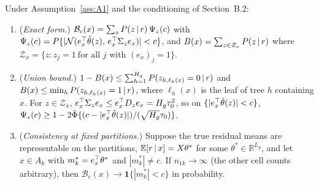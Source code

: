 \begin{propA}\label{prop:ensemble}
Under Assumption~\ref{ass:A1} and the conditioning of Section~B.2:
\begin{enumerate}[label=(\alph*),leftmargin=2.2em]
\item (\emph{Exact form.}) $\mathcal B_c(x)=\sum_zP(z\,\vert\, r)\,\Psi_z(c)$ with $\Psi_z(c)=P\{|\mathcal{N}(e_x^{\top}\hat\theta(z),\,e_x^{\top}\Sigma_ze_x)|<c\}$, and $B(x)=\sum_{z\in\mathcal Z_x}P(z\,\vert\, r)$ where $\mathcal Z_x=\{z:z_j=1\ \text{for all }j\text{ with }(e_x)_j=1\}$.
\item (\emph{Union bound.}) $1-B(x)\le\sum_{h=1}^{H_g}P(z_{h,\ell_h(x)}=0\,\vert\, r)$ and $B(x)\le\min_hP(z_{h,\ell_h(x)}=1\,\vert\, r)$, where $\ell_h(x)$ is the leaf of tree $h$ containing $x$. For $z\in\mathcal Z_x$, $e_x^{\top}\Sigma_ze_x\le e_x^{\top} D_ze_x=H_g\tau_0^2$, so on $\{|e_x^{\top}\hat\theta(z)|<c\}$, $\Psi_z(c)\ge1-2\bar\Phi\{(c-|e_x^{\top}\hat\theta(z)|)/(\sqrt{H_g}\tau_0)\}$.
\item (\emph{Consistency at fixed partitions.}) Suppose the true residual means are representable on the partitions, $\mathbb{E}[r\,\vert\, x]=X\theta^\ast$ for some $\theta^\ast\in\mathbb R^{L_g}$, and let $x\in A_k$ with $m_k^\ast=e_x^{\top}\theta^\ast$ and $|m_k^\ast|\ne c$. If $n_{1k}\to\infty$ (the other cell counts arbitrary), then $\mathcal B_c(x)\to\mathbf 1\{|m^\ast_k|<c\}$ in probability.
\end{enumerate}
\end{propA}

